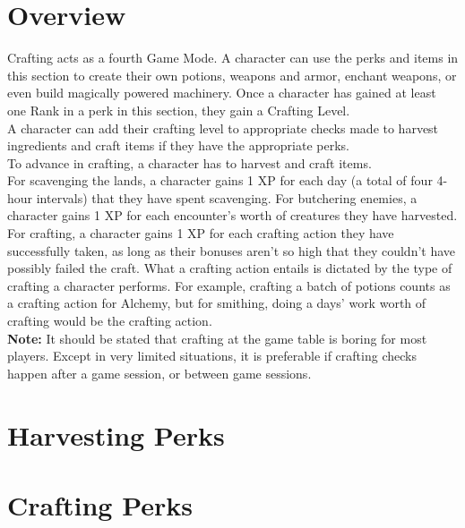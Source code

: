 \chapter{Overview}\label{ch:craftingOverview}
Crafting acts as a fourth Game Mode.
A character can use the perks and items in this section to create their own potions, weapons and armor, enchant weapons, or even build magically powered machinery.
Once a character has gained at least one Rank in a perk in this section, they gain a Crafting Level.\\
A character can add their crafting level to appropriate checks made to harvest ingredients and craft items if they have the appropriate perks.\\
To advance in crafting, a character has to harvest and craft items.\\
For scavenging the lands, a character gains 1 XP for each day (a total of four 4-hour intervals) that they have spent scavenging.
For butchering enemies, a character gains 1 XP for each encounter's worth of creatures they have harvested.\\
For crafting, a character gains 1 XP for each crafting action they have successfully taken, as long as their bonuses aren't so high that they couldn't have possibly failed the craft.
What a crafting action entails is dictated by the type of crafting a character performs.
For example, crafting a batch of potions counts as a crafting action for Alchemy, but for smithing, doing a days' work worth of crafting would be the crafting action.\\
\textbf{Note:} It should be stated that crafting at the game table is boring for most players.
Except in very limited situations, it is preferable if crafting checks happen after a game session, or between game sessions.

\chapter{Harvesting Perks}\label{sec:harvestingPerks}









\chapter{Crafting Perks}\label{sec:craftingPerks}


